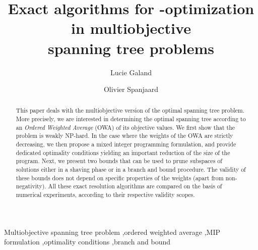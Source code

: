 \documentclass[final,3p,times]{elsarticle}
\begin{document}
\begin{frontmatter}







\title{Exact algorithms for -optimization in multiobjective\\ spanning tree problems}
\author[LIP6]{Lucie Galand}
\author[LIP6]{Olivier Spanjaard}
\address[LIP6]{LIP6-CNRS, Universit\'e Pierre et Marie Curie (UPMC), 104 Avenue du Pr\'esident Kennedy, F-75016 Paris, France}


\begin{abstract}
This paper deals with the multiobjective version of the optimal
spanning tree problem. More precisely, we are interested in determining the optimal
spanning tree according to an \emph{Ordered Weighted Average} (OWA) of its objective values. We first show that the problem is
weakly NP-hard. In the case where the weights of the OWA are strictly decreasing, we then propose a mixed integer programming formulation, and provide dedicated optimality conditions yielding an important reduction of the size of the program. Next, we present two bounds that can be used to prune
subspaces of solutions either in a shaving phase or in a branch and bound procedure. The validity of these bounds does not depend on specific properties of the weights (apart from non-negativity). All these exact resolution algorithms are compared on the basis of numerical experiments, according to their respective validity scopes. 
\end{abstract}

\begin{keyword}
Multiobjective spanning tree problem \sep ordered weighted
  average \sep MIP formulation \sep optimality conditions \sep branch and bound 


\end{keyword}

\end{frontmatter}
\end{document}
